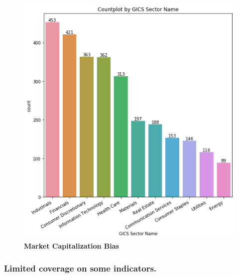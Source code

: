 \documentclass[12pt]{report}
\begin{document}
\begin{figure}[h!]
\centering
\includegraphics[scale=0.5]{sector_distribution.png}
\caption{\textbf{Market Capitalization Bias}}
\label{fig:marketcap}
\end{figure}
 
 
\subsubsection{Limited coverage on some indicators.}
\end{document}
